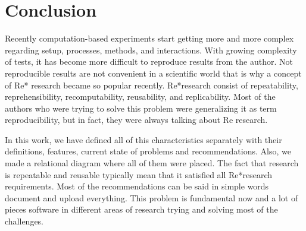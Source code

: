 \documentclass{vldb}
\begin{document}
\section{Conclusion}
Recently computation-based experiments start getting more and more complex regarding setup, processes, methods, and interactions. With growing complexity of tests, it has become more difficult to reproduce results from the author. Not reproducible results are not convenient in a scientific world that is why a concept of Re* research became so popular recently. Re*research consist of repeatability, reprehensibility, recomputability, reusability, and replicability. Most of the authors who were trying to solve this problem were generalizing it as term reproducibility, but in fact, they were always talking about Re research. \par
In this work, we have defined all of this characteristics separately with their definitions, features, current state of problems and recommendations. Also, we made a relational diagram where all of them were placed. The fact that research is repeatable and reusable typically mean that it satisfied all Re*research requirements. Most of the recommendations can be said in simple words document and upload everything. This problem is fundamental now and a lot of pieces software in different areas of research trying and solving most of the challenges. 


\end{document}
